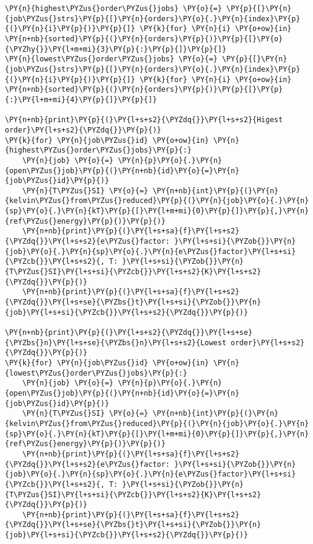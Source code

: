     \begin{tcolorbox}[breakable, size=fbox, boxrule=1pt, pad at break*=1mm,colback=cellbackground, colframe=cellborder]
\begin{Verbatim}[commandchars=\\\{\}]
\PY{n}{highest\PYZus{}order\PYZus{}jobs} \PY{o}{=} \PY{p}{[}\PY{n}{job\PYZus{}strs}\PY{p}{[}\PY{n}{orders}\PY{o}{.}\PY{n}{index}\PY{p}{(}\PY{n}{i}\PY{p}{)}\PY{p}{]} \PY{k}{for} \PY{n}{i} \PY{o+ow}{in} \PY{n+nb}{sorted}\PY{p}{(}\PY{n}{orders}\PY{p}{)}\PY{p}{[}\PY{o}{\PYZhy{}}\PY{l+m+mi}{3}\PY{p}{:}\PY{p}{]}\PY{p}{]}
\PY{n}{lowest\PYZus{}order\PYZus{}jobs} \PY{o}{=} \PY{p}{[}\PY{n}{job\PYZus{}strs}\PY{p}{[}\PY{n}{orders}\PY{o}{.}\PY{n}{index}\PY{p}{(}\PY{n}{i}\PY{p}{)}\PY{p}{]} \PY{k}{for} \PY{n}{i} \PY{o+ow}{in} \PY{n+nb}{sorted}\PY{p}{(}\PY{n}{orders}\PY{p}{)}\PY{p}{[}\PY{p}{:}\PY{l+m+mi}{4}\PY{p}{]}\PY{p}{]}

\PY{n+nb}{print}\PY{p}{(}\PY{l+s+s2}{\PYZdq{}}\PY{l+s+s2}{Higest order}\PY{l+s+s2}{\PYZdq{}}\PY{p}{)}
\PY{k}{for} \PY{n}{job\PYZus{}id} \PY{o+ow}{in} \PY{n}{highest\PYZus{}order\PYZus{}jobs}\PY{p}{:}
    \PY{n}{job} \PY{o}{=} \PY{n}{p}\PY{o}{.}\PY{n}{open\PYZus{}job}\PY{p}{(}\PY{n+nb}{id}\PY{o}{=}\PY{n}{job\PYZus{}id}\PY{p}{)}
    \PY{n}{T\PYZus{}SI} \PY{o}{=} \PY{n+nb}{int}\PY{p}{(}\PY{n}{kelvin\PYZus{}from\PYZus{}reduced}\PY{p}{(}\PY{n}{job}\PY{o}{.}\PY{n}{sp}\PY{o}{.}\PY{n}{kT}\PY{p}{[}\PY{l+m+mi}{0}\PY{p}{]}\PY{p}{,}\PY{n}{ref\PYZus{}energy}\PY{p}{)}\PY{p}{)}
    \PY{n+nb}{print}\PY{p}{(}\PY{l+s+sa}{f}\PY{l+s+s2}{\PYZdq{}}\PY{l+s+s2}{e\PYZus{}factor: }\PY{l+s+si}{\PYZob{}}\PY{n}{job}\PY{o}{.}\PY{n}{sp}\PY{o}{.}\PY{n}{e\PYZus{}factor}\PY{l+s+si}{\PYZcb{}}\PY{l+s+s2}{, T: }\PY{l+s+si}{\PYZob{}}\PY{n}{T\PYZus{}SI}\PY{l+s+si}{\PYZcb{}}\PY{l+s+s2}{K}\PY{l+s+s2}{\PYZdq{}}\PY{p}{)}
    \PY{n+nb}{print}\PY{p}{(}\PY{l+s+sa}{f}\PY{l+s+s2}{\PYZdq{}}\PY{l+s+se}{\PYZbs{}t}\PY{l+s+si}{\PYZob{}}\PY{n}{job}\PY{l+s+si}{\PYZcb{}}\PY{l+s+s2}{\PYZdq{}}\PY{p}{)}
    
\PY{n+nb}{print}\PY{p}{(}\PY{l+s+s2}{\PYZdq{}}\PY{l+s+se}{\PYZbs{}n}\PY{l+s+se}{\PYZbs{}n}\PY{l+s+s2}{Lowest order}\PY{l+s+s2}{\PYZdq{}}\PY{p}{)}
\PY{k}{for} \PY{n}{job\PYZus{}id} \PY{o+ow}{in} \PY{n}{lowest\PYZus{}order\PYZus{}jobs}\PY{p}{:}
    \PY{n}{job} \PY{o}{=} \PY{n}{p}\PY{o}{.}\PY{n}{open\PYZus{}job}\PY{p}{(}\PY{n+nb}{id}\PY{o}{=}\PY{n}{job\PYZus{}id}\PY{p}{)}
    \PY{n}{T\PYZus{}SI} \PY{o}{=} \PY{n+nb}{int}\PY{p}{(}\PY{n}{kelvin\PYZus{}from\PYZus{}reduced}\PY{p}{(}\PY{n}{job}\PY{o}{.}\PY{n}{sp}\PY{o}{.}\PY{n}{kT}\PY{p}{[}\PY{l+m+mi}{0}\PY{p}{]}\PY{p}{,}\PY{n}{ref\PYZus{}energy}\PY{p}{)}\PY{p}{)}
    \PY{n+nb}{print}\PY{p}{(}\PY{l+s+sa}{f}\PY{l+s+s2}{\PYZdq{}}\PY{l+s+s2}{e\PYZus{}factor: }\PY{l+s+si}{\PYZob{}}\PY{n}{job}\PY{o}{.}\PY{n}{sp}\PY{o}{.}\PY{n}{e\PYZus{}factor}\PY{l+s+si}{\PYZcb{}}\PY{l+s+s2}{, T: }\PY{l+s+si}{\PYZob{}}\PY{n}{T\PYZus{}SI}\PY{l+s+si}{\PYZcb{}}\PY{l+s+s2}{K}\PY{l+s+s2}{\PYZdq{}}\PY{p}{)}
    \PY{n+nb}{print}\PY{p}{(}\PY{l+s+sa}{f}\PY{l+s+s2}{\PYZdq{}}\PY{l+s+se}{\PYZbs{}t}\PY{l+s+si}{\PYZob{}}\PY{n}{job}\PY{l+s+si}{\PYZcb{}}\PY{l+s+s2}{\PYZdq{}}\PY{p}{)}
\end{Verbatim}
\end{tcolorbox}

